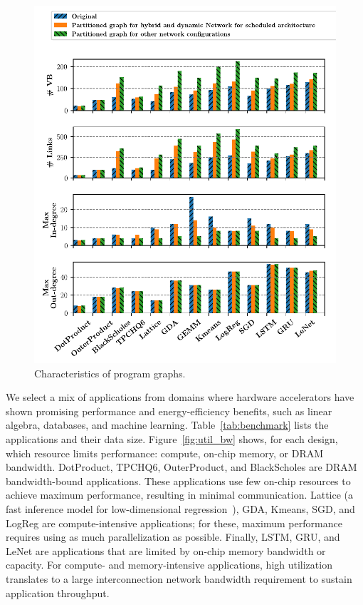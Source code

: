 \begin{figure}
\centering
\includegraphics[width=1\columnwidth]{figs/graph.pdf}
\caption{Characteristics of program graphs.}\label{fig:graph}
\end{figure}

We select a mix of applications from domains where hardware accelerators have shown promising performance and energy-efficiency benefits, such as linear algebra, databases, and machine learning.
Table~\ref{tab:benchmark} lists the applications and their data size.
Figure~\ref{fig:util_bw} shows, for each design, which resource limits performance: compute, on-chip memory, or DRAM bandwidth. 
DotProduct, TPCHQ6, OuterProduct, and BlackScholes are DRAM bandwidth-bound applications. 
These applications use few on-chip resources to achieve maximum performance, resulting in minimal communication.
Lattice (a fast inference model for low-dimensional regression~\cite{garcia2009lattice}), GDA, Kmeans, SGD, and LogReg are compute-intensive applications; for these, maximum performance requires using as much parallelization as possible. 
Finally, LSTM, GRU, and LeNet are applications that are limited by on-chip memory bandwidth or capacity. 
For compute- and memory-intensive applications, high utilization translates to a large interconnection network bandwidth requirement to sustain application throughput. 

